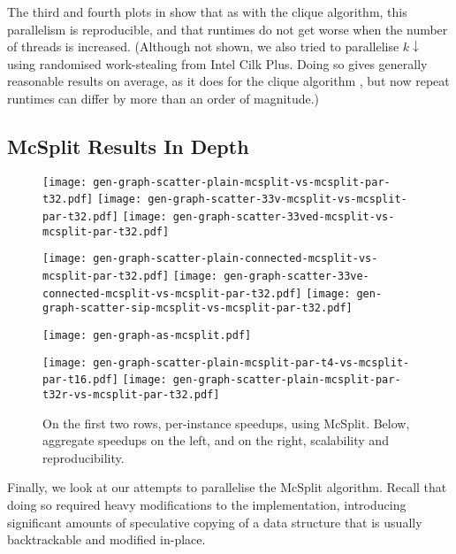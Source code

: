 \documentclass{llncs}
\begin{document}
The third and fourth plots in  show that as with the clique algorithm,
this parallelism is reproducible, and that runtimes do not get worse when the number of threads is
increased. (Although not shown, we also tried to parallelise $k{\downarrow}$ using randomised
work-stealing from Intel Cilk Plus. Doing so gives generally reasonable results on average, as it
does for the clique algorithm \cite{DBLP:journals/topc/McCreeshP15}, but now repeat runtimes can
differ by more than an order of magnitude.)

\subsection{McSplit Results In Depth}

\begin{figure}[p]
    \texttt{[image: gen-graph-scatter-plain-mcsplit-vs-mcsplit-par-t32.pdf]}
    \hfill
    \texttt{[image: gen-graph-scatter-33v-mcsplit-vs-mcsplit-par-t32.pdf]}
    \hfill
    \texttt{[image: gen-graph-scatter-33ved-mcsplit-vs-mcsplit-par-t32.pdf]}

    \vspace*{0.2em}

    \texttt{[image: gen-graph-scatter-plain-connected-mcsplit-vs-mcsplit-par-t32.pdf]}
    \hfill
    \texttt{[image: gen-graph-scatter-33ve-connected-mcsplit-vs-mcsplit-par-t32.pdf]}
    \hfill
    \texttt{[image: gen-graph-scatter-sip-mcsplit-vs-mcsplit-par-t32.pdf]}

    \vspace*{2em}

    \begin{minipage}[c]{0.62\textwidth}
    \texttt{[image: gen-graph-as-mcsplit.pdf]}
    \end{minipage}
    \hfill
    \begin{minipage}[t]{0.35\textwidth}
    \texttt{[image: gen-graph-scatter-plain-mcsplit-par-t4-vs-mcsplit-par-t16.pdf]}
    \vspace*{0.2em}
    \texttt{[image: gen-graph-scatter-plain-mcsplit-par-t32r-vs-mcsplit-par-t32.pdf]}
    \end{minipage}

    \caption{On the first two rows, per-instance speedups, using McSplit. Below, aggregate speedups
    on the left, and on the right, scalability and reproducibility.}\label{figure:mcsplitscatter}
\end{figure}

Finally, we look at our attempts to parallelise the McSplit algorithm. Recall that doing so required
heavy modifications to the implementation, introducing significant amounts of speculative copying of a
data structure that is usually backtrackable and modified in-place.
\end{document}
